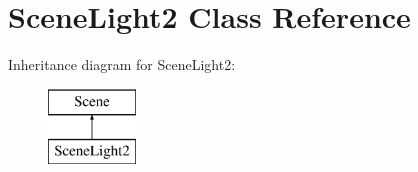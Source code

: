 \hypertarget{class_scene_light2}{\section{Scene\+Light2 Class Reference}
\label{class_scene_light2}
}
Inheritance diagram for Scene\+Light2\+:\begin{figure}[H]
\begin{center}
\leavevmode
\includegraphics[height=2.000000cm]{class_scene_light2}
\end{center}
\end{figure}
